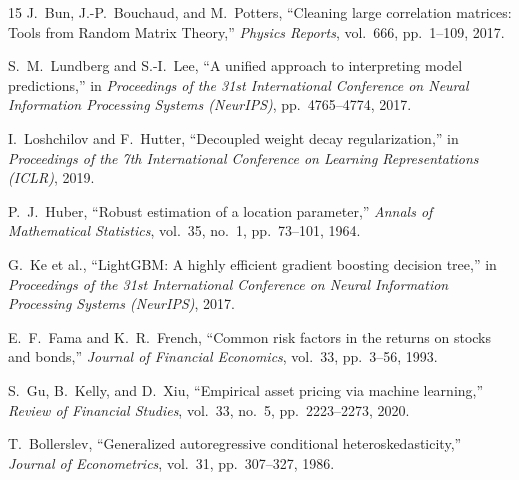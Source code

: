 \documentclass[conference]{IEEEtran}
\begin{document}
\begin{thebibliography}{15}
 J.~Bun, J.-P.~Bouchaud, and M.~Potters, ``Cleaning large correlation matrices: Tools from Random Matrix Theory,'' \emph{Physics Reports}, vol.~666, pp.~1--109, 2017.

 S.~M.~Lundberg and S.-I.~Lee, ``A unified approach to interpreting model predictions,'' in \emph{Proceedings of the 31st International Conference on Neural Information Processing Systems (NeurIPS)}, pp.~4765--4774, 2017.

 I.~Loshchilov and F.~Hutter, ``Decoupled weight decay regularization,'' in \emph{Proceedings of the 7th International Conference on Learning Representations (ICLR)}, 2019.

 P.~J.~Huber, ``Robust estimation of a location parameter,'' \emph{Annals of Mathematical Statistics}, vol.~35, no.~1, pp.~73--101, 1964.

 G.~Ke et al., ``LightGBM: A highly efficient gradient boosting decision tree,'' in \emph{Proceedings of the 31st International Conference on Neural Information Processing Systems (NeurIPS)}, 2017.

 E.~F.~Fama and K.~R.~French, ``Common risk factors in the returns on stocks and bonds,'' \emph{Journal of Financial Economics}, vol.~33, pp.~3--56, 1993.

 S.~Gu, B.~Kelly, and D.~Xiu, ``Empirical asset pricing via machine learning,'' \emph{Review of Financial Studies}, vol.~33, no.~5, pp.~2223--2273, 2020.

 T.~Bollerslev, ``Generalized autoregressive conditional heteroskedasticity,'' \emph{Journal of Econometrics}, vol.~31, pp.~307--327, 1986.

\end{thebibliography}
\end{document}
